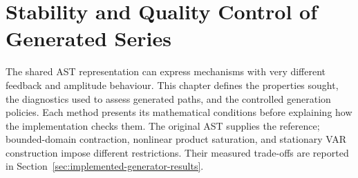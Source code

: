 \clearpage
\section{Stability and Quality Control of Generated Series}
\label{sec:generator-stability}

The shared AST representation can express mechanisms with very different
feedback and amplitude behaviour. This chapter defines the properties sought,
the diagnostics used to assess generated paths, and the controlled generation
policies. Each method presents its mathematical conditions before explaining
how the implementation checks them. The original AST supplies the reference;
bounded-domain contraction, nonlinear product saturation, and stationary VAR
construction impose different restrictions. Their measured trade-offs are
reported in Section~\ref{sec:implemented-generator-results}.








